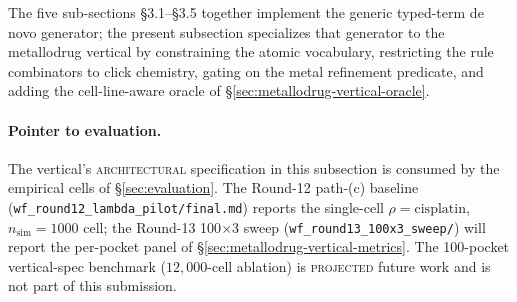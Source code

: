 The five sub-sections \S3.1--\S3.5 together implement the
generic typed-term de novo generator; the present subsection
specializes that generator to the metallodrug vertical by
constraining the atomic vocabulary, restricting the rule
combinators to click chemistry, gating on the metal
refinement predicate, and adding the cell-line-aware oracle
of \S\ref{sec:metallodrug-vertical-oracle}.

\paragraph{Pointer to evaluation.}
The vertical's \textsc{architectural} specification in this
subsection is consumed by the empirical cells of
\S\ref{sec:evaluation}. The Round-12 path-(c) baseline
(\texttt{wf\_round12\_lambda\_pilot/final.md}) reports the
single-cell $\rho=\text{cisplatin}$, $n_\text{sim}=1000$ cell;
the Round-13 100$\times$3 sweep
(\texttt{wf\_round13\_100x3\_sweep/}) will report the
per-pocket panel of \S\ref{sec:metallodrug-vertical-metrics}.
The 100-pocket vertical-spec benchmark
($12{,}000$-cell ablation) is \textsc{projected} future
work and is not part of this submission.
